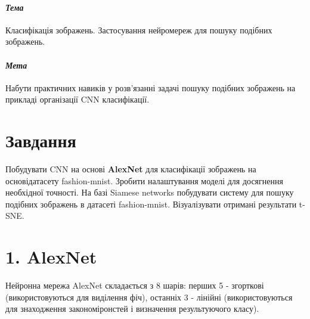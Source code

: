 \documentclass{/home/alx/Documents/LaTex/nulp}
\begin{document}

\paragraph*{\textit{Тема}} Класифікація зображень.
Застосування нейромереж для пошуку подібних зображень.

\paragraph*{\textit{Мета}} Набути практичних навиків у розв’язанні задачі пошуку подібних зображень на прикладі організації CNN класифікації.

\justify

\section*{Завдання}

Побудувати CNN на основі \textbf{AlexNet} для класифікації зображень на основідатасету fashion-mnist. Зробити налаштування моделі для досягнення необхідної точності. На базі Siamese networks побудувати систему для пошуку подібних зображень в датасеті fashion-mnist. Візуалізувати отримані результати t-SNE.


\newpage

\section*{1. AlexNet}

Нейронна мережа AlexNet складається з 8 шарів: перших 5 - згорткові (використовуються для виділення фіч), останніх 3 - лінійні (використовуються для знаходження закономіронстей і визначення результуючого класу).
\end{document}
